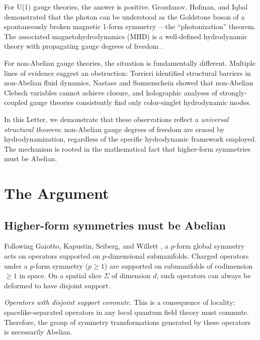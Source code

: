 \documentclass[aps,prl,twocolumn,superscriptaddress,showpacs]{revtex4-2}
\begin{document}
For U(1) gauge theories, the answer is positive. Grozdanov, Hofman, and
Iqbal demonstrated that the photon can be understood as the Goldstone
boson of a spontaneously broken magnetic 1-form symmetry
\cite{GrozdanovHofmanIqbal}---the ``photonization'' theorem. The
associated magnetohydrodynamics (MHD) is a well-defined hydrodynamic
theory with propagating gauge degrees of freedom
\cite{HofmanIqbal,GrozdanovHofmanIqbal}.

For non-Abelian gauge theories, the situation is fundamentally
different. Multiple lines of evidence suggest an obstruction:
Torrieri \cite{Torrieri2020} identified structural barriers in
non-Abelian fluid dynamics, Nastase and Sonnenschein
\cite{NastaseSonnenschein2025} showed that non-Abelian Clebsch
variables cannot achieve closure, and holographic analyses of
strongly-coupled gauge theories consistently find only
color-singlet hydrodynamic modes.

In this Letter, we demonstrate that these observations reflect a
\emph{universal structural theorem}: non-Abelian gauge degrees of
freedom are erased by hydrodynamization, regardless of the specific
hydrodynamic framework employed. The mechanism is rooted in the
mathematical fact that higher-form symmetries must be Abelian.

\section{The Argument}

\subsection{Higher-form symmetries must be Abelian}

Following Gaiotto, Kapustin, Seiberg, and Willett \cite{GKSW2015},
a $p$-form global symmetry acts on operators supported on
$p$-dimensional submanifolds. Charged operators under a $p$-form
symmetry ($p \geq 1$) are supported on submanifolds of codimension
$\geq 1$ in space. On a spatial slice $\Sigma$ of dimension $d$,
such operators can always be deformed to have disjoint support.

\emph{Operators with disjoint support commute.} This is a
consequence of locality: spacelike-separated operators in any local
quantum field theory must commute. Therefore, the group of symmetry
transformations generated by these operators is necessarily Abelian.
\end{document}
